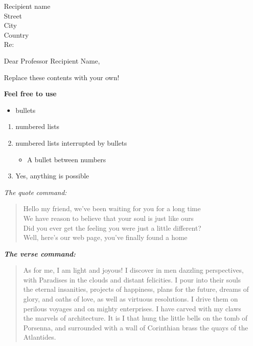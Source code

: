 \documentclass[12pt,letterpaper]{letter} %
\begin{document}
\begin{letter}{Recipient name \\ Street\\ City\\ Country \\ [\parskip]
Re:}
\opening{Dear Professor Recipient Name,}

Replace these contents with your own!

\lipsum[1-3] %

\newpage %


\textbf{Feel free to use}

\begin{itemize}
    \item bullets 
\end{itemize}
\begin{enumerate}
    \item numbered lists 
    \item numbered lists interrupted by bullets 
    \begin{itemize}
        \item A bullet between numbers  
    \end{itemize}
    \item Yes, anything is possible
\end{enumerate}

\textit{The quote command:}

\begin{quotation}
Hello my friend, we've been waiting for you for a long time \\
We have reason to believe that your soul is just like ours \\
Did you ever get the feeling you were just a little different? \\
Well, here’s our web page, you've finally found a home
\end{quotation}

\textbf{\textit{The verse command:}}

\begin{verse}
As for me, I am light and joyous! I discover in men dazzling perspectives, with Paradises in the clouds and distant felicities. I pour into their souls the eternal insanities, projects of happiness, plans for the future, dreams of glory, and oaths of love, as well as virtuous resolutions. I drive them on perilous voyages and on mighty enterprises. I have carved with my claws the marvels of architecture. It is I that hung the little bells on the tomb of Porsenna, and surrounded with a wall of Corinthian brass the quays of the Atlantides.


\end{verse}
\end{letter}
\end{document}
